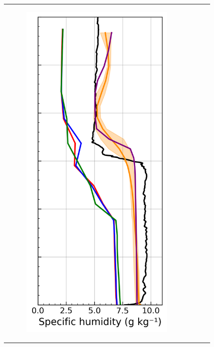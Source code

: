 \begin{figure}[hbtp]
{\begin{tabular}{@{}cccc@{}}
\begin{subfigure}[t]{0.289\textwidth}
            \includegraphics[width=\textwidth]{images/chap6/profiles/profile_elsplans_ovap_2007_.png}

\end{subfigure}
\end{tabular}}
\end{figure}
